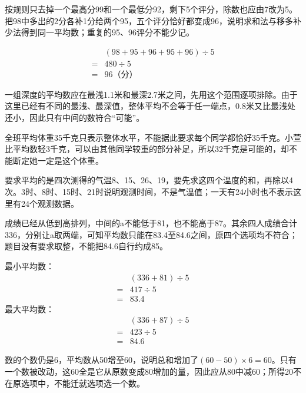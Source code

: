 \documentclass[multi=snippet,border=0pt]{standalone}
\newenvironment{snippet}[3]{\begin{minipage}{#1bp}\color{answerred}\fontsize{#2}{#3}\selectfont\raggedright}{\end{minipage}}
\begin{document}
\begin{snippet}{505}{11.5}{14}按规则只去掉一个最高分99和一个最低分92，剩下5个评分，除数也应由7改为5。把98中多出的2分各补1分给两个95，五个评分恰好都变成96，说明求和法与移多补少法得到同一平均数；重复的95、96评分不能少记。\par \[\begin{aligned}&(98+95+96+95+96)\div5\\={}&480\div5\\={}&96\text{（分）}\end{aligned}\]\end{snippet}
\begin{snippet}{505}{11.5}{14}一组深度的平均数应在最浅1.1米和最深2.7米之间，先用这个范围逐项排除。由于这里已经有不同的最浅、最深值，整体平均不会等于任一端点，0.8米又比最浅处还小，因此只有中间的数符合“可能”。\end{snippet}
\begin{snippet}{505}{11.5}{14}全班平均体重35千克只表示整体水平，不能据此要求每个同学都恰好35千克。小萱比平均数轻3千克，可以由其他同学较重的部分补足，所以32千克是可能的，却不能断定她一定是这个体重。\end{snippet}
\begin{snippet}{505}{11.5}{14}要求平均的是四次测得的气温8、15、26、19，要先求这四个温度的和，再除以4次。3时、8时、15时、21时说明观测时间，不是气温值；一天有24小时也不表示这里有24个观测数据。\end{snippet}
\begin{snippet}{505}{11.5}{14}成绩已经从低到高排列，中间的a不能低于81，也不能高于87。其余四人成绩合计336，分别让a取两端，可知平均数只能在83.4至84.6之间，原四个选项均不符合；题目没有要求取整，不能把84.6自行约成85。\par 最小平均数：\[\begin{aligned}&(336+81)\div5\\={}&417\div5\\={}&83.4\end{aligned}\]最大平均数：\[\begin{aligned}&(336+87)\div5\\={}&423\div5\\={}&84.6\end{aligned}\]\end{snippet}
\begin{snippet}{505}{11.5}{14}数的个数仍是6，平均数从50增至60，说明总和增加了\((60-50)\times6=60\)。只有一个数被改动，这60全是它从原数变成80增加的量，因此应从80中减60；所得20不在原选项中，不能迁就选项选一个数。\end{snippet}
\end{document}
